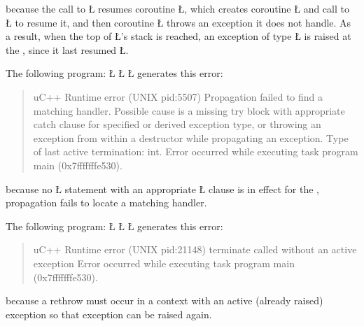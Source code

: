 \documentclass[openright,twoside]{report}
\begin{document}
because the call to \LGinlinetrue\LGbegin\lgrinde\L{}\endlgrinde\LGend{} resumes coroutine \LGinlinetrue\LGbegin\lgrinde\L{}\endlgrinde\LGend{}, which creates coroutine \LGinlinetrue\LGbegin\lgrinde\L{}\endlgrinde\LGend{} and call to \LGinlinetrue\LGbegin\lgrinde\L{}\endlgrinde\LGend{} to resume it, and then coroutine \LGinlinetrue\LGbegin\lgrinde\L{}\endlgrinde\LGend{} throws an exception it does not handle.
As a result, when the top of \LGinlinetrue\LGbegin\lgrinde\L{}\endlgrinde\LGend{}'s stack is reached, an exception of type \LGinlinetrue\LGbegin\lgrinde\L{}\endlgrinde\LGend{} is raised at the , since it last resumed \LGinlinetrue\LGbegin\lgrinde\L{}\endlgrinde\LGend{}.

The following program:
\LGinlinefalse\LGbegin\lgrinde
\L{}
\L{\LB{}}
\L{\LB{\}}}
\endlgrinde\LGend
generates this error:
\begin{quote}
\BGfont
uC++ Runtime error (UNIX pid:5507) Propagation failed to find a matching handler.
Possible cause is a missing try block with appropriate catch clause for specified or derived exception type,
or throwing an exception from within a destructor while propagating an exception.
Type of last active termination: int.
Error occurred while executing task program main (0x7fffffffe530).
\end{quote}
because no \LGinlinetrue\LGbegin\lgrinde\L{}\endlgrinde\LGend{} statement with an appropriate \LGinlinetrue\LGbegin\lgrinde\L{}\endlgrinde\LGend{} clause is in effect for the , propagation fails to locate a matching handler.

The following program:
\LGinlinefalse\LGbegin\lgrinde
\L{}
\L{\LB{}}
\CE{}\L{\LB{\}}}
\endlgrinde\LGend
generates this error:
\begin{quote}
\BGfont
uC++ Runtime error (UNIX pid:21148) terminate called without an active exception
Error occurred while executing task program main (0x7fffffffe530).
\end{quote}
because a rethrow must occur in a context with an active (already raised) exception so that exception can be raised again.
\end{document}
